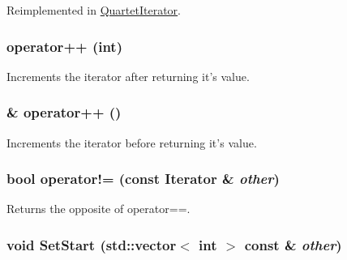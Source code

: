 Reimplemented in \hyperlink{classJKBuilder_1_1QuartetIterator_a5f692b73d2e160450f4617bb75825e11}{QuartetIterator}.\hypertarget{classJKBuilder_1_1Iterator_ac1702aedba13b4112b891b58dfd78eba}{
\subsubsection[{operator++}]{ operator++ (int)}}
\label{classJKBuilder_1_1Iterator_ac1702aedba13b4112b891b58dfd78eba}


Increments the iterator after returning it's value. \hypertarget{classJKBuilder_1_1Iterator_ae1f21c74128a5ef5d1b9de72ceb09be8}{
\subsubsection[{operator++}]{ \& operator++ ()}}
\label{classJKBuilder_1_1Iterator_ae1f21c74128a5ef5d1b9de72ceb09be8}


Increments the iterator before returning it's value. \hypertarget{classJKBuilder_1_1Iterator_a8c06af8ae0d9d1614ae9f81629275926}{
\subsubsection[{operator!=}]{\setlength{\rightskip}{0pt plus 5cm}bool operator!= (const {\bf Iterator} \& {\em other})}}
\label{classJKBuilder_1_1Iterator_a8c06af8ae0d9d1614ae9f81629275926}


Returns the opposite of operator==. \hypertarget{classJKBuilder_1_1Iterator_aa83de505e29125c1d3ac7bb1b13ca15a}{
\subsubsection[{SetStart}]{\setlength{\rightskip}{0pt plus 5cm}void SetStart (std::vector$<$ int $>$ const \& {\em other})}}
\label{classJKBuilder_1_1Iterator_aa83de505e29125c1d3ac7bb1b13ca15a}



